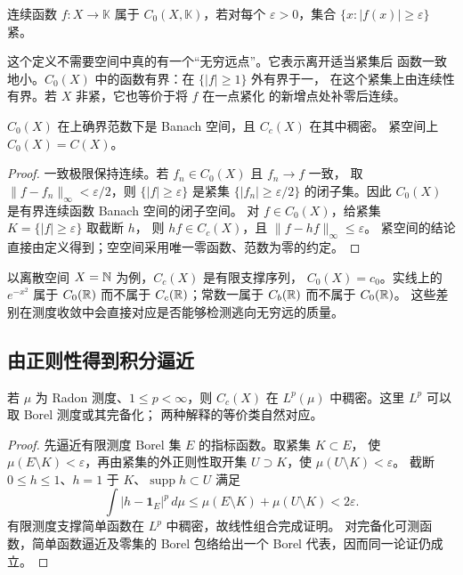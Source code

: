 \begin{definition}
连续函数 \(f:X\to\mathbb K\) 属于 \(C_0(X,\mathbb K)\)，若对每个
\(\varepsilon>0\)，集合 \(\{x:|f(x)|\ge\varepsilon\}\) 紧。
\end{definition}

这个定义不需要空间中真的有一个“无穷远点”。它表示离开适当紧集后
函数一致地小。\(C_0(X)\) 中的函数有界：在 \(\{|f|\ge1\}\) 外有界于一，
在这个紧集上由连续性有界。若 \(X\) 非紧，它也等价于将 \(f\) 在一点紧化
的新增点处补零后连续。

\begin{proposition}\label{prop:cc-dense-czero}
\(C_0(X)\) 在上确界范数下是 Banach 空间，且 \(C_c(X)\) 在其中稠密。
紧空间上 \(C_0(X)=C(X)\)。
\end{proposition}
\begin{proof}
一致极限保持连续。若 \(f_n\in C_0(X)\) 且 \(f_n\to f\) 一致，
取 \(\|f-f_n\|_\infty<\varepsilon/2\)，则
\(\{|f|\ge\varepsilon\}\) 是紧集
\(\{|f_n|\ge\varepsilon/2\}\) 的闭子集。因此 \(C_0(X)\) 是有界连续函数
Banach 空间的闭子空间。
对 \(f\in C_0(X)\)，给紧集 \(K=\{|f|\ge\varepsilon\}\) 取截断 \(h\)，
则 \(hf\in C_c(X)\)，且 \(\|f-hf\|_\infty\le\varepsilon\)。
紧空间的结论直接由定义得到；空空间采用唯一零函数、范数为零的约定。
\end{proof}

以离散空间 \(X=\mathbb{N}\) 为例，\(C_c(X)\) 是有限支撑序列，
\(C_0(X)=c_0\)。实线上的 \(e^{-x^2}\) 属于 \(C_0(\mathbb{R})\) 而不属于
\(C_c(\mathbb{R})\)；常数一属于 \(C_b(\mathbb{R})\) 而不属于 \(C_0(\mathbb{R})\)。
这些差别在测度收敛中会直接对应是否能够检测逃向无穷远的质量。

\subsection{由正则性得到积分逼近}

\begin{proposition}\label{prop:radon-cc-lp-density}
若 \(\mu\) 为 Radon 测度、\(1\le p<\infty\)，则 \(C_c(X)\) 在
\(L^p(\mu)\) 中稠密。这里 \(L^p\) 可以取 Borel 测度或其完备化；
两种解释的等价类自然对应。
\end{proposition}
\begin{proof}
先逼近有限测度 Borel 集 \(E\) 的指标函数。取紧集 \(K\subset E\)，
使 \(\mu(E\setminus K)<\varepsilon\)，再由紧集的外正则性取开集
\(U\supset K\)，使 \(\mu(U\setminus K)<\varepsilon\)。
截断 \(0\le h\le1\)、\(h=1\) 于 \(K\)、\(\operatorname{supp}h\subset U\)
满足
\[
 \int|h-\mathbf1_E|^p\,d\mu
 \le\mu(E\setminus K)+\mu(U\setminus K)<2\varepsilon.
\]
有限测度支撑简单函数在 \(L^p\) 中稠密，故线性组合完成证明。
对完备化可测函数，简单函数逼近及零集的 Borel 包络给出一个
Borel 代表，因而同一论证仍成立。
\end{proof}

